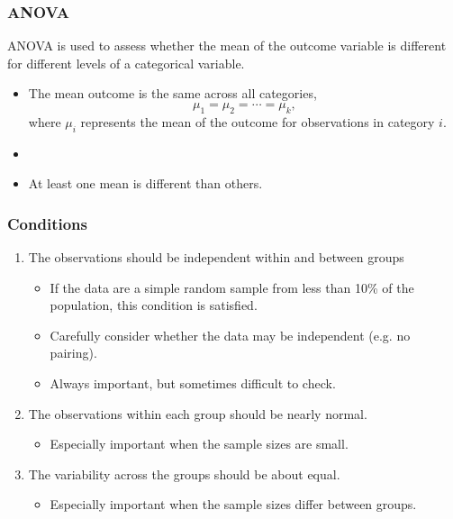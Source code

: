 
\begin{frame}
\frametitle{ANOVA}

ANOVA is used to assess whether the mean of the outcome variable is different for different levels of a categorical variable.

\pause

\begin{itemize}
\item[]  The mean outcome is the same across all categories, 
\[\mu_1 = \mu_2 = \cdots = \mu_k, \]
where $\mu_i$ represents the mean of the outcome for observations in category $i$.
\item[]
\item[]  At least one mean is different than others.
\end{itemize}

\end{frame}


\begin{frame}
\frametitle{Conditions}

\begin{enumerate}

\item The observations should be independent within and between groups

\begin{itemize}
\item If the data are a simple random sample from less than 10\% of the population, this condition is satisfied.
\item Carefully consider whether the data may be independent (e.g. no pairing). 
\item Always important, but sometimes difficult to check.
\end{itemize}

\pause

\item The observations within each group should be nearly normal.

\begin{itemize}
\item Especially important when the sample sizes are small.
\end{itemize}


\pause

\item The variability across the groups should be about equal.

\begin{itemize}
\item Especially important when the sample sizes differ between groups.
\end{itemize}


\end{enumerate}

\end{frame}

